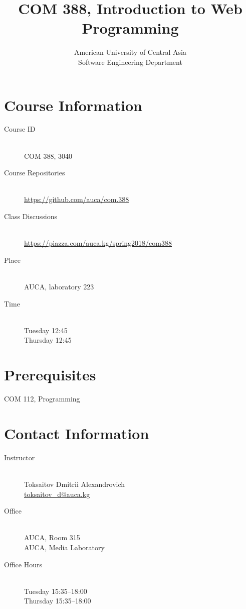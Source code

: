 \documentclass[12pt,a4paper,oneside]{article}
\newcommand{\R}[1]{\uppercase\expandafter{\romannumeral #1\relax}}
\begin{document}
    \title{COM 388, Introduction to Web Programming}
    \author{
        American University of Central Asia\\
        Software Engineering Department
    }
    \date{}
    \maketitle

    \section{Course Information}

        \begin{description}
            \item[Course ID]\hfill\\
                COM 388, 3040
            \item[Course Repositories]\hfill\\
                \url{https://github.com/auca/com.388}
            \item[Class Discussions]\hfill\\
                \url{https://piazza.com/auca.kg/spring2018/com388}
            \item[Place]\hfill\\
                AUCA, laboratory 223
            \item[Time]\hfill\\
                Tuesday 12:45\\
                Thursday 12:45
        \end{description}

    \section{Prerequisites}

        COM 112, Programming \R{2}

    \section{Contact Information}

        \begin{description}
            \item[Instructor]\hfill\\
                Toksaitov Dmitrii Alexandrovich\\
                \href{mailto:toksaitov_d@auca.kg}{toksaitov\_d@auca.kg}
            \item[Office]\hfill\\
                AUCA, Room 315\\
                AUCA, Media Laboratory
            \item[Office Hours]\hfill\\
                Tuesday 15:35--18:00\\
                Thursday 15:35--18:00
        \end{description}
\end{document}
